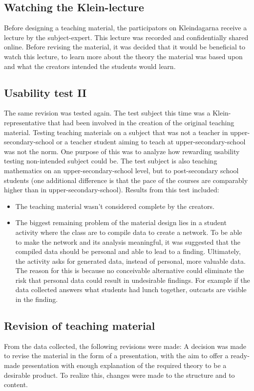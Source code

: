 \subsection{Watching the Klein-lecture}
Before designing a teaching material, the participators on Kleindagarna receive a lecture by the subject-expert. This lecture was recorded and confidentially shared online. Before revising the material, it was decided that it would be beneficial to watch this lecture, to learn more about the theory the material was based upon and what the creators intended the students would learn.
\subsection{Usability test II}
The same revision was tested again. The test subject this time was a Klein-representative that had been involved in the creation of the original teaching material. Testing teaching materials on a subject that was not a teacher in upper-secondary-school or a teacher student aiming to teach at upper-secondary-school was not the norm. One purpose of this was to analyze how rewarding usability testing non-intended subject could be. The test subject is also teaching mathematics on an upper-secondary-school level, but to post-secondary school students (one additional difference is that the pace of the courses are comparably higher than in upper-secondary-school). Results from this test included:
\begin{itemize}
    \item The teaching material wasn't considered complete by the creators.
    \item The biggest remaining problem of the material design lies in a student activity where the class are to compile data to create a network. To be able to make the network and its analysis meaningful, it was suggested that the compiled data should be personal and able to lead to a finding. Ultimately, the activity asks for generated data, instead of personal, more valuable data. The reason for this is because no conceivable alternative could eliminate the risk that personal data could result in undesirable findings. For example if the data collected answers what students had lunch together, outcasts are visible in the finding.
\end{itemize}
\subsection{Revision of teaching material}
From the data collected, the following revisions were made:
A decision was made to revise the material in the form of a presentation, with the aim to offer a ready-made presentation with enough explanation of the required theory to be a desirable product. To realize this, changes were made to the structure and to content.
